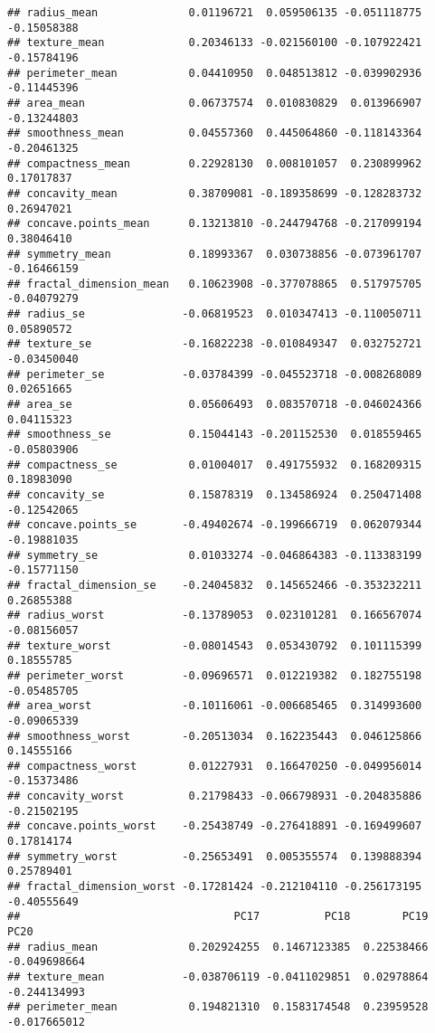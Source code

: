 \documentclass[
]{article}
\begin{document}
\begin{verbatim}
## radius_mean              0.01196721  0.059506135 -0.051118775 -0.15058388
## texture_mean             0.20346133 -0.021560100 -0.107922421 -0.15784196
## perimeter_mean           0.04410950  0.048513812 -0.039902936 -0.11445396
## area_mean                0.06737574  0.010830829  0.013966907 -0.13244803
## smoothness_mean          0.04557360  0.445064860 -0.118143364 -0.20461325
## compactness_mean         0.22928130  0.008101057  0.230899962  0.17017837
## concavity_mean           0.38709081 -0.189358699 -0.128283732  0.26947021
## concave.points_mean      0.13213810 -0.244794768 -0.217099194  0.38046410
## symmetry_mean            0.18993367  0.030738856 -0.073961707 -0.16466159
## fractal_dimension_mean   0.10623908 -0.377078865  0.517975705 -0.04079279
## radius_se               -0.06819523  0.010347413 -0.110050711  0.05890572
## texture_se              -0.16822238 -0.010849347  0.032752721 -0.03450040
## perimeter_se            -0.03784399 -0.045523718 -0.008268089  0.02651665
## area_se                  0.05606493  0.083570718 -0.046024366  0.04115323
## smoothness_se            0.15044143 -0.201152530  0.018559465 -0.05803906
## compactness_se           0.01004017  0.491755932  0.168209315  0.18983090
## concavity_se             0.15878319  0.134586924  0.250471408 -0.12542065
## concave.points_se       -0.49402674 -0.199666719  0.062079344 -0.19881035
## symmetry_se              0.01033274 -0.046864383 -0.113383199 -0.15771150
## fractal_dimension_se    -0.24045832  0.145652466 -0.353232211  0.26855388
## radius_worst            -0.13789053  0.023101281  0.166567074 -0.08156057
## texture_worst           -0.08014543  0.053430792  0.101115399  0.18555785
## perimeter_worst         -0.09696571  0.012219382  0.182755198 -0.05485705
## area_worst              -0.10116061 -0.006685465  0.314993600 -0.09065339
## smoothness_worst        -0.20513034  0.162235443  0.046125866  0.14555166
## compactness_worst        0.01227931  0.166470250 -0.049956014 -0.15373486
## concavity_worst          0.21798433 -0.066798931 -0.204835886 -0.21502195
## concave.points_worst    -0.25438749 -0.276418891 -0.169499607  0.17814174
## symmetry_worst          -0.25653491  0.005355574  0.139888394  0.25789401
## fractal_dimension_worst -0.17281424 -0.212104110 -0.256173195 -0.40555649
##                                 PC17          PC18        PC19         PC20
## radius_mean              0.202924255  0.1467123385  0.22538466 -0.049698664
## texture_mean            -0.038706119 -0.0411029851  0.02978864 -0.244134993
## perimeter_mean           0.194821310  0.1583174548  0.23959528 -0.017665012

\end{verbatim}
\end{document}
